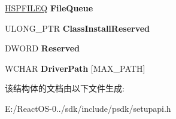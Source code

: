 \begin{DoxyCompactItemize}
\item 
\mbox{\label{struct___s_p___d_e_v_i_n_s_t_a_l_l___p_a_r_a_m_s___w_a02970f6bc2fe41d0a82b69ab77fe586f}} 
\hyperlink{interfacevoid}{H\+S\+P\+F\+I\+L\+EQ} {\bfseries File\+Queue}
\item 
\mbox{\label{struct___s_p___d_e_v_i_n_s_t_a_l_l___p_a_r_a_m_s___w_a4a5b48f5cf75ba931fbc634c46fa679f}} 
U\+L\+O\+N\+G\+\_\+\+P\+TR {\bfseries Class\+Install\+Reserved}
\item 
\mbox{\label{struct___s_p___d_e_v_i_n_s_t_a_l_l___p_a_r_a_m_s___w_abedfbf05d01b70c4c3a546c8f8e2a073}} 
D\+W\+O\+RD {\bfseries Reserved}
\item 
\mbox{\label{struct___s_p___d_e_v_i_n_s_t_a_l_l___p_a_r_a_m_s___w_af9deb13691aeb8346a63a29432e3a0d8}} 
W\+C\+H\+AR {\bfseries Driver\+Path} \mbox{[}M\+A\+X\+\_\+\+P\+A\+TH\mbox{]}
\end{DoxyCompactItemize}


该结构体的文档由以下文件生成\+:\begin{DoxyCompactItemize}
\item 
E\+:/\+React\+O\+S-\/0../sdk/include/psdk/setupapi.\+h\end{DoxyCompactItemize}
